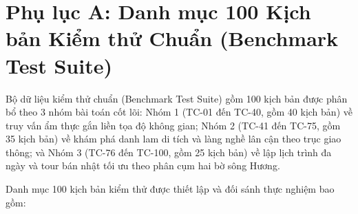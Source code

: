 \label{phan:phu-luc}

\section*{Phụ lục A: Danh mục 100 Kịch bản Kiểm thử Chuẩn (Benchmark Test Suite)}
{}

Bộ dữ liệu kiểm thử chuẩn (Benchmark Test Suite) gồm 100 kịch bản được phân bổ theo 3 nhóm bài toán cốt lõi: Nhóm 1 (TC-01 đến TC-40, gồm 40 kịch bản) về truy vấn ẩm thực gắn liền tọa độ không gian; Nhóm 2 (TC-41 đến TC-75, gồm 35 kịch bản) về khám phá danh lam di tích và làng nghề lân cận theo trục giao thông; và Nhóm 3 (TC-76 đến TC-100, gồm 25 kịch bản) về lập lịch trình đa ngày và tour bán nhật tối ưu theo phân cụm hai bờ sông Hương.

Danh mục 100 kịch bản kiểm thử được thiết lập và đối sánh thực nghiệm bao gồm:

